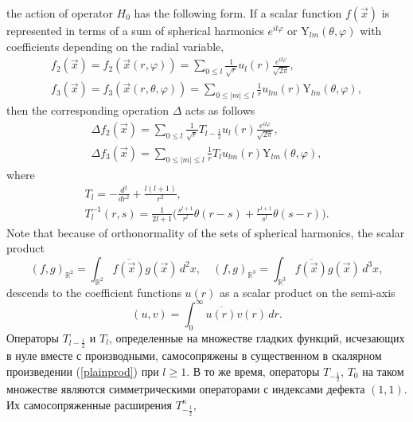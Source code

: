 \documentclass[12pt]{article}
\newcommand{\ol}{\overline}
\newcommand{\RR}{\mathbb{R}}
\newcommand{\YY}{\mathrm{Y}}
\begin{document}
	the action of operator
$ H_{0} $
	has the following form.
	If a scalar function
$ f(\vec{x}) $
	is represented in terms of a sum of spherical harmonics
$ e^{il\varphi} $ or
$ \YY_{lm}(\theta,\varphi) $
	with coefficients depending on the radial variable,
\begin{gather*}
    f_{2}(\vec{x}) = f_{2}(\vec{x}(r,\varphi)) = \sum_{0\leq l}
    \frac{1}{\sqrt{r}} u_{l}(r)
        \frac{e^{il\varphi}}{\sqrt{2\pi}} , \\
    f_{3}(\vec{x}) = f_{3}(\vec{x}(r,\theta,\varphi)) = \sum_{0\leq |m| \leq l}
    \frac{1}{r} u_{lm}(r)
        \YY_{lm}(\theta,\varphi) , 
\end{gather*}
	then the corresponding operation
$ \Delta $
	acts as follows
\begin{gather*}
    \Delta f_{2}(\vec{x})
        = \sum_{0\leq l} \frac{1}{\sqrt{r}}T_{l-\frac{1}{2}} u_{l}(r)
	    \frac{e^{il\varphi}}{\sqrt{2\pi}} , \\
    \Delta f_{3}(\vec{x})
        = \sum_{0\leq |m| \leq l} \frac{1}{r}T_{l} u_{lm}(r)
	\YY_{lm}(\theta,\varphi) ,
\end{gather*}
	where
\begin{gather}
\label{Tl}
    T_{l} = -\frac{d^{2}}{dr^{2}} + \frac{l(l+1)}{r^{2}} ,\\
\nonumber
    T_{l}^{-1}(r,s) = \frac{1}{2l+1}\bigl(\frac{s^{l+1}}{r^{l}} \theta(r-s)
	+ \frac{r^{l+1}}{s^{l}}\theta(s-r)\bigr).
\end{gather}
	Note that because of orthonormality of the sets of spherical
	harmonics, the scalar product
\begin{equation*}
    (f,g)_{\RR^{2}} = \int_{\RR^{2}} \ol{f(\vec{x})} g(\vec{x}) \,d^{2}x ,
\quad
    (f,g)_{\RR^{3}} = \int_{\RR^{3}} \ol{f(\vec{x})} g(\vec{x}) \,d^{3}x ,
\end{equation*}
	descends to the coefficient functions
$ u(r) $
	as a scalar product on the semi-axis
\begin{equation}
\label{plainprod}
    (u,v) = \int_{0}^{\infty} \ol{u(r)} v(r) \, dr .
\end{equation}
    Операторы
$ T_{l-\frac{1}{2}} $ и
$ T_{l} $,
    определенные
    на множестве гладких функций,
    исчезающих в нуле вместе с производными,
    самосопряжены в существенном в скалярном произведении
(\ref{plainprod})
    при
$ l \geq 1 $.
    В то же время, операторы
$ T_{-\frac{1}{2}} $,
$ T_{0} $
    на таком множестве являются симметрическими операторами с индексами
    дефекта
$ (1,1) $.
    Их самосопряженные расширения
$ T_{-\frac{1}{2}}^{\kappa} $,
\end{document}
